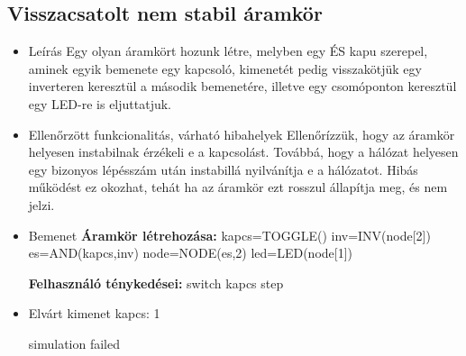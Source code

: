 \subsection{Visszacsatolt nem stabil áramkör}
\begin{itemize}
\item Leírás\newline
Egy olyan áramkört hozunk létre, melyben egy ÉS kapu szerepel, aminek egyik bemenete egy kapcsoló, kimenetét pedig visszakötjük egy inverteren keresztül a második bemenetére, illetve egy csomóponton keresztül egy LED-re is eljuttatjuk.
\item Ellenőrzött funkcionalitás, várható hibahelyek\newline
Ellenőrízzük, hogy az áramkör helyesen instabilnak érzékeli e a kapcsolást. Továbbá, hogy a hálózat helyesen egy bizonyos lépésszám után instabillá nyilvánítja e a hálózatot. Hibás működést ez okozhat, tehát ha az áramkör ezt rosszul állapítja meg, és nem jelzi.
\item Bemenet\newline
\newline
{\bf Áramkör létrehozása:}\newline
kapcs=TOGGLE()\newline
inv=INV(node[2])\newline
es=AND(kapcs,inv)\newline
node=NODE(es,2)\newline
led=LED(node[1])\newline

{\bf Felhasználó ténykedései:}\newline
switch kapcs\newline
step\newline

\item Elvárt kimenet\newline
kapcs: 1\newline

simulation failed\newline


\end{itemize}


